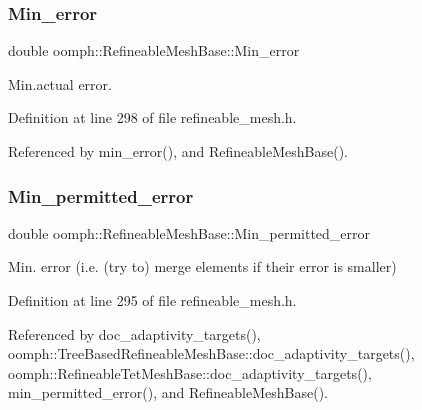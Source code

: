 \subsubsection{\texorpdfstring{Min\+\_\+error}{Min\_error}}
{\footnotesize\ttfamily double oomph\+::\+Refineable\+Mesh\+Base\+::\+Min\+\_\+error\hspace{0.3cm}{\ttfamily [protected]}}



Min.\+actual error. 



Definition at line 298 of file refineable\+\_\+mesh.\+h.



Referenced by min\+\_\+error(), and Refineable\+Mesh\+Base().

\mbox{\label{classoomph_1_1RefineableMeshBase_ac623d3a2406dc79c517636ad6abad0d3}} 
\subsubsection{\texorpdfstring{Min\+\_\+permitted\+\_\+error}{Min\_permitted\_error}}
{\footnotesize\ttfamily double oomph\+::\+Refineable\+Mesh\+Base\+::\+Min\+\_\+permitted\+\_\+error\hspace{0.3cm}{\ttfamily [protected]}}



Min. error (i.\+e. (try to) merge elements if their error is smaller) 



Definition at line 295 of file refineable\+\_\+mesh.\+h.



Referenced by doc\+\_\+adaptivity\+\_\+targets(), oomph\+::\+Tree\+Based\+Refineable\+Mesh\+Base\+::doc\+\_\+adaptivity\+\_\+targets(), oomph\+::\+Refineable\+Tet\+Mesh\+Base\+::doc\+\_\+adaptivity\+\_\+targets(), min\+\_\+permitted\+\_\+error(), and Refineable\+Mesh\+Base().

\mbox{\label{classoomph_1_1RefineableMeshBase_a1a35c13c3c37ddc5ac2852217d903459}} 
